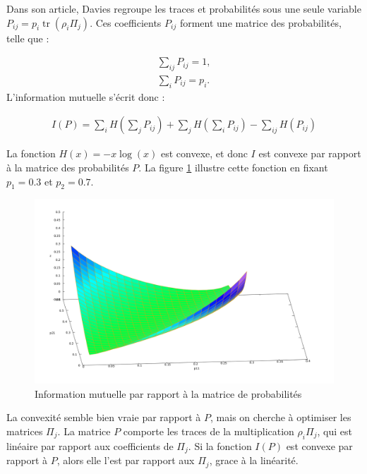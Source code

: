 \documentclass[12pt,a4paper]{article}
\DeclareMathOperator{\tr}{tr}
\begin{document}
    Dans son article, Davies regroupe les traces et probabilités sous une seule variable $P_{ij} = p_i \tr(\rho_i \Pi_j)$. Ces coefficients $P_{ij}$ forment une matrice des probabilités, telle que :

    \begin{align}
        \displaystyle \sum_{ij} P_{ij} = 1, \\
        \displaystyle \sum_{i}  P_{ij} = p_i.
    \end{align}
    L'information mutuelle s'écrit donc :

    \begin{align}
        I(P) = \displaystyle \sum_{i} H(\displaystyle \sum_{j}P_{ij}) + \displaystyle \sum_{j} H(\displaystyle \sum_{i}P_{ij}) -  \displaystyle \sum_{ij} H(P_{ij}) 
    \end{align}

    La fonction $H(x) = -x \log(x)$ est convexe, et donc $I$ est convexe par rapport à la matrice des probabilités $P$. La figure \ref{fig:mi_convex} illustre cette fonction en fixant $p_1 = 0.3$ et $p_2 = 0.7$.

    \begin{figure}[h]
        \centering
        \includegraphics[scale=0.2]{MI_convex.png}
        \caption{Information mutuelle par rapport à la matrice de probabilités}
        \label{fig:mi_convex}
    \end{figure}
    
    La convexité semble bien vraie par rapport à $P$, mais on cherche à optimiser les matrices $\Pi_j$. La matrice $P$ comporte les traces de la multiplication $\rho_i \Pi_j$, qui est linéaire par rapport aux coefficients de $\Pi_j$. Si la fonction $I(P)$ est convexe par rapport à $P$, alors elle l'est par rapport aux $\Pi_j$, grace à la linéarité.
\end{document}
